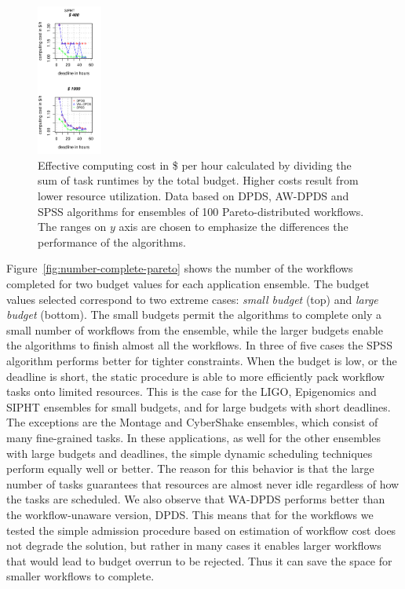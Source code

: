 \documentclass{sig-alternate}
\begin{document}
\begin{figure}[htb]
\includegraphics[width=0.19\textwidth]{figures/pareto-cost-SIPHT-n-1000-8-dagh5-50m0.pdf}
\caption{Effective computing cost in \$ per hour calculated by dividing the sum of
task runtimes by the total budget. Higher costs result from lower resource utilization. Data based on DPDS, AW-DPDS and SPSS algorithms for ensembles of 100
Pareto-distributed workflows. The ranges on $y$ axis are chosen to 
emphasize the differences the performance of the algorithms.}
\label{fig:cost}
\end{figure}

Figure~\ref{fig:number-complete-pareto} shows the number of the workflows
completed for two budget values for each application ensemble. The budget values
selected correspond to two extreme cases: {\em small budget} (top) and {\em
large budget} (bottom). The small budgets permit the algorithms to complete 
only a small number of workflows from the ensemble, while the larger budgets 
enable the algorithms to finish almost all the workflows. In three of
five cases the SPSS algorithm performs better for tighter constraints. When the 
budget is low, or the deadline is short, the static procedure is able to more 
efficiently pack workflow tasks onto limited resources. This is the case for 
the LIGO, Epigenomics and SIPHT ensembles for small budgets, and for large
budgets with short deadlines. The exceptions are the Montage and CyberShake 
ensembles,  which consist of many fine-grained tasks. In these applications, 
as well for the other ensembles with large budgets and deadlines, the simple 
dynamic scheduling techniques perform equally well or better. The reason for 
this behavior is that the large number of tasks guarantees that resources 
are almost never idle regardless of how the tasks are scheduled. We also 
observe that WA-DPDS performs better than the workflow-unaware version, DPDS. 
This means that for the workflows we tested the simple admission procedure based 
on estimation of workflow cost does not degrade the solution, but rather in 
many cases it enables larger workflows that would lead to budget overrun to
be rejected. Thus it can save the space for smaller workflows to complete.
\end{document}
